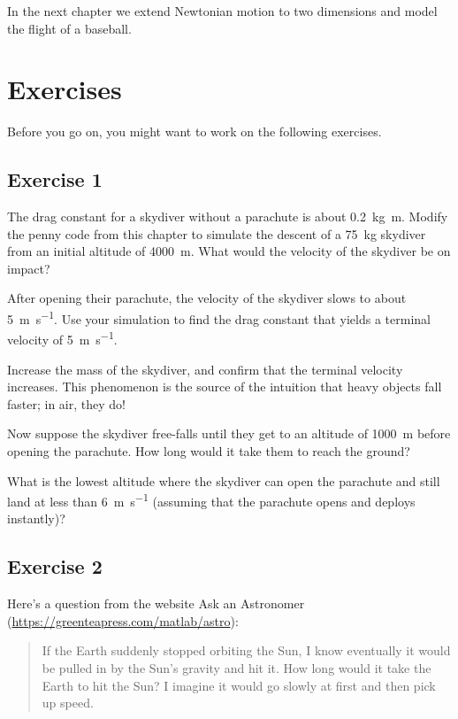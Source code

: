 In the next chapter we extend Newtonian motion to two dimensions and model the flight of a baseball.


\section{Exercises}

Before you go on, you might want to work on the following exercises.

\subsection{Exercise 1}

The drag constant for a skydiver without a parachute is about \SI{0.2}{\kilogram \meter}.  Modify the penny code from this chapter to simulate the descent of a \SI{75}{\kilogram} skydiver from an initial altitude of \SI{4000}{\meter}.  What would the velocity of the skydiver be on impact?

After opening their parachute, the velocity of the skydiver slows to about \SI{5}{\meter\per\second}.  Use your simulation to find the drag constant that yields a terminal velocity of \SI{5}{\meter\per\second}.

Increase the mass of the skydiver, and confirm that the terminal velocity increases.  This phenomenon is the source of the intuition that heavy objects fall faster; in air, they do!

Now suppose the skydiver free-falls until they get to an altitude of \SI{1000}{\meter} before opening the parachute.  How long would it take them to reach the ground?

What is the lowest altitude where the skydiver can open the parachute and still land at less than \SI{6}{\meter\per\second} (assuming that the parachute opens and deploys instantly)?





\subsection{Exercise 2}
\label{earth}


Here's a question from the website {Ask an Astronomer} (\url{https://greenteapress.com/matlab/astro}):

\begin{quote}
If the Earth suddenly stopped orbiting the Sun, I know eventually it would be pulled in by the Sun's gravity and hit it. How long would it take the Earth to hit the Sun? I imagine it would go slowly at first and then pick up speed.
\end{quote}

